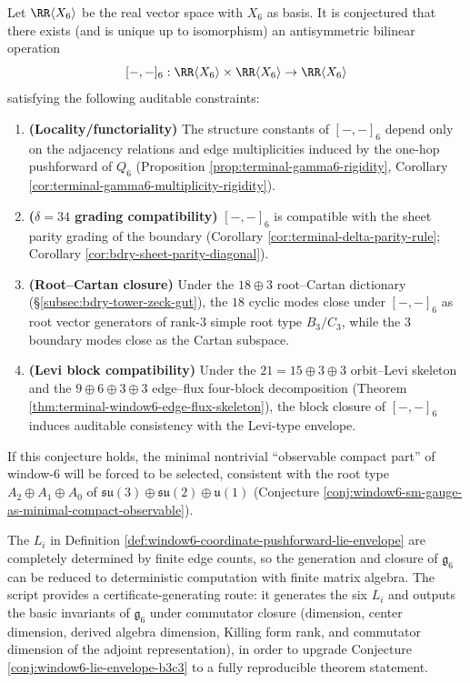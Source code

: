 \begin{conjecture}\label{conj:window6-bracket-uniqueness-sm}
Let \(\RR\langle X_6\rangle\) be the real vector space with \(X_6\) as basis.
It is conjectured that there exists (and is unique up to isomorphism) an antisymmetric bilinear operation
\[
[-,-]_6:\RR\langle X_6\rangle\times \RR\langle X_6\rangle\to \RR\langle X_6\rangle
\]
satisfying the following auditable constraints:
\begin{enumerate}
  \item \textbf{(Locality/functoriality)} The structure constants of \([-,-]_6\) depend only on the adjacency relations and edge multiplicities induced by the one-hop pushforward of \(Q_6\) (Proposition \ref{prop:terminal-gamma6-rigidity}, Corollary \ref{cor:terminal-gamma6-multiplicity-rigidity}).
  \item \textbf{(\(\delta=34\) grading compatibility)} \([-,-]_6\) is compatible with the sheet parity grading of the boundary (Corollary \ref{cor:terminal-delta-parity-rule}; Corollary \ref{cor:bdry-sheet-parity-diagonal}).
  \item \textbf{(Root--Cartan closure)} Under the \(18\oplus 3\) root--Cartan dictionary (\S\ref{subsec:bdry-tower-zeck-gut}), the \(18\) cyclic modes close under \([-,-]_6\) as root vector generators of rank-\(3\) simple root type \(B_3/C_3\), while the \(3\) boundary modes close as the Cartan subspace.
  \item \textbf{(Levi block compatibility)} Under the \(21=15\oplus 3\oplus 3\) orbit--Levi skeleton and the \(9\oplus 6\oplus 3\oplus 3\) edge--flux four-block decomposition (Theorem \ref{thm:terminal-window6-edge-flux-skeleton}), the block closure of \([-,-]_6\) induces auditable consistency with the Levi-type envelope.
\end{enumerate}
If this conjecture holds, the minimal nontrivial ``observable compact part'' of window-\(6\) will be forced to be selected, consistent with the root type \(A_2\oplus A_1\oplus A_0\) of \(\mathfrak{su}(3)\oplus\mathfrak{su}(2)\oplus\mathfrak{u}(1)\) (Conjecture \ref{conj:window6-sm-gauge-as-minimal-compact-observable}).
\end{conjecture}

\begin{remark}\label{rem:window6-lie-envelope-audit-route}
The \(L_i\) in Definition \ref{def:window6-coordinate-pushforward-lie-envelope} are completely determined by finite edge counts, so the generation and closure of \(\mathfrak{g}_6\) can be reduced to deterministic computation with finite matrix algebra.
The script \texttt{} provides a certificate-generating route: it generates the six \(L_i\) and outputs the basic invariants of \(\mathfrak{g}_6\) under commutator closure (dimension, center dimension, derived algebra dimension, Killing form rank, and commutator dimension of the adjoint representation), in order to upgrade Conjecture \ref{conj:window6-lie-envelope-b3c3} to a fully reproducible theorem statement.
\end{remark}

